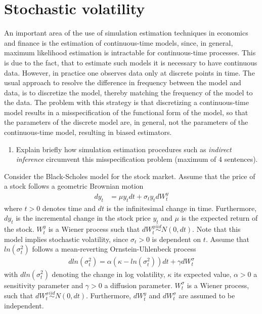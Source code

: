 \documentclass{article}
\begin{document}
\newpage

\section{Stochastic volatility}

An important area of the use of simulation estimation techniques in economics and finance is the estimation of continuous-time models, since, in general, maximum likelihood estimation is intractable for continuous-time processes. This is due to the fact, that to estimate such models it is necessary to have continuous data. However, in practice one observes data only at discrete points in time. The usual approach to resolve the difference in frequency between the model and data, is to discretize the model, thereby matching the frequency of the model to the data. The problem with this strategy is that discretizing a continuous-time model results in a misspecification of the functional form of the model, so that the parameters of the discrete model are, in general, not the parameters of the continuous-time model, resulting in biased estimators.

\begin{enumerate}[label=(\alph*)]
  \item Explain briefly how simulation estimation procedures such as \emph{indirect inference} circumvent this misspecification problem (maximum of 4 sentences).
\end{enumerate}

\noindent Consider the Black-Scholes model for the stock market. Assume that the price of a stock follows a geometric Brownian motion
\begin{align}
  dy_t &= \mu y_t dt + \sigma_t y_t dW_{t}^y\label{eq:price}
\end{align}
where $t>0$ denotes time and $dt$ is the infinitesimal change in time. Furthermore, $dy_t$ is the incremental change in the stock price $y_t$ and $\mu$ is the expected return of the stock. $W_t^{y}$ is a Wiener process such that $dW_t^{y} \overset{iid}{\sim} N(0,dt)$. Note that this model implies stochastic volatility, since $\sigma_t>0$ is dependent on $t$. Assume that $ln (\sigma_t^2)$ follows a mean-reverting Ornstein-Uhlenbeck process
\begin{align}
  dln(\sigma_t^2) = \alpha(\kappa -ln(\sigma_t^2))dt + \gamma dW_t^\sigma\label{eq:volat}
\end{align}
with $dln(\sigma_t^2)$ denoting the change in log volatility, $\kappa$ its expected value, $\alpha>0$ a sensitivity parameter and $\gamma>0$ a diffusion parameter. $W_t^\sigma$ is a Wiener process, such that $dW_t^{\sigma} \overset{iid}{\sim} N(0,dt)$. Furthermore, $dW_t^y$ and $dW_t^\sigma$ are assumed to be independent.
\end{document}
